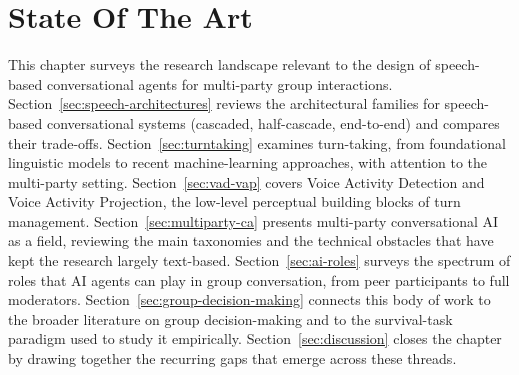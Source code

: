 \chapter{State Of The Art}
\label{ch:state-of-the-art}

This chapter surveys the research landscape relevant to the design of speech-based conversational agents for multi-party group interactions. Section~\ref{sec:speech-architectures} reviews the architectural families for speech-based conversational systems (cascaded, half-cascade, end-to-end) and compares their trade-offs. Section~\ref{sec:turntaking} examines turn-taking, from foundational linguistic models to recent machine-learning approaches, with attention to the multi-party setting. Section~\ref{sec:vad-vap} covers Voice Activity Detection and Voice Activity Projection, the low-level perceptual building blocks of turn management. Section~\ref{sec:multiparty-ca} presents multi-party conversational AI as a field, reviewing the main taxonomies and the technical obstacles that have kept the research largely text-based. Section~\ref{sec:ai-roles} surveys the spectrum of roles that AI agents can play in group conversation, from peer participants to full moderators. Section~\ref{sec:group-decision-making} connects this body of work to the broader literature on group decision-making and to the survival-task paradigm used to study it empirically. Section~\ref{sec:discussion} closes the chapter by drawing together the recurring gaps that emerge across these threads.










